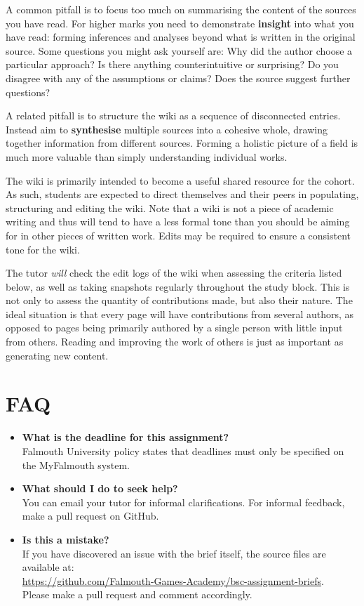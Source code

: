 \documentclass{../../fal_assignment}
\begin{document}
A common pitfall is to focus too much on summarising the content of the sources you have read.
For higher marks you need to demonstrate \textbf{insight} into what you have read:
forming inferences and analyses beyond what is written in the original source.
Some questions you might ask yourself are:
Why did the author choose a particular approach?
Is there anything counterintuitive or surprising?
Do you disagree with any of the assumptions or claims?
Does the source suggest further questions?

A related pitfall is to structure the wiki as a sequence of disconnected entries.
Instead aim to \textbf{synthesise} multiple sources into a cohesive whole,
drawing together information from different sources.
Forming a holistic picture of a field is much more valuable than simply understanding individual works.

The wiki is primarily intended to become a useful shared resource for the cohort.
As such, students are expected to direct themselves and their peers in populating, structuring and editing the wiki.
Note that a wiki is not a piece of academic writing
and thus will tend to have a less formal tone than you should be aiming for in other pieces of written work.
Edits may be required to ensure a consistent tone for the wiki.

The tutor \emph{will} check the edit logs of the wiki when assessing the criteria listed below,
as well as taking snapshots regularly throughout the study block.
This is not only to assess the quantity of contributions made,
but also their nature.
The ideal situation is that every page will have contributions from several authors,
as opposed to pages being primarily authored by a single person with little input from others.
Reading and improving the work of others is just as important as generating new content.

\section*{FAQ}

\begin{itemize}
	\item 	\textbf{What is the deadline for this assignment?} \\ 
    		Falmouth University policy states that deadlines must only be specified on the MyFalmouth system.
    		
	\item 	\textbf{What should I do to seek help?} \\ 
    		You can email your tutor for informal clarifications. For informal feedback, make a pull request on GitHub. 
    		
    	\item 	\textbf{Is this a mistake?} \\ 	
    		If you have discovered an issue with the brief itself, the source files are available at: \\
    		\url{https://github.com/Falmouth-Games-Academy/bsc-assignment-briefs}.\\
    		 Please make a pull request and comment accordingly.
\end{itemize}
\end{document}
